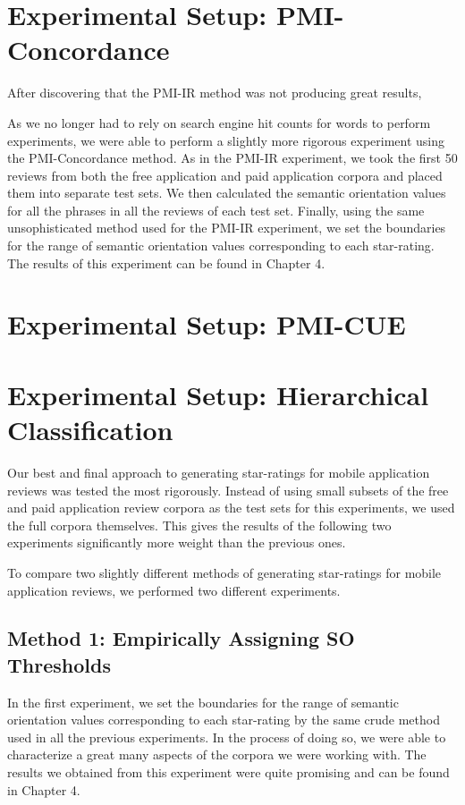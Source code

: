 \documentclass[11pt]{report} %
\begin{document}
\section{Experimental Setup: PMI-Concordance}

After discovering that the PMI-IR method was not producing great results, 

As we no longer had to rely on search engine hit counts for words to perform experiments, we were able to perform a slightly more rigorous experiment using the PMI-Concordance method. As in the PMI-IR experiment, we took the first 50 reviews from both the free application and paid application corpora and placed them into separate test sets. We then calculated the semantic orientation values for all the phrases in all the reviews of each test set. Finally, using the same unsophisticated method used for the PMI-IR experiment, we set the boundaries for the range of semantic orientation values corresponding to each star-rating. The results of this experiment can be found in Chapter 4. 

\section{Experimental Setup: PMI-CUE}

\section{Experimental Setup: Hierarchical Classification}

Our best and final approach to generating star-ratings for mobile application reviews was tested the most rigorously. Instead of using small subsets of the free and paid application review corpora as the test sets for this experiments, we used the full corpora themselves. This gives the results of the following two experiments significantly more weight than the previous ones.

To compare two slightly different methods of generating star-ratings for mobile application reviews, we performed two different experiments.

	\subsection{Method 1: Empirically Assigning SO Thresholds}

In the first experiment, we set the boundaries for the range of semantic orientation values corresponding to each star-rating by the same crude method used in all the previous experiments. In the process of doing so, we were able to characterize a great many aspects of the corpora we were working with. The results we obtained from this experiment were quite promising and can be found in Chapter 4.
\end{document}

